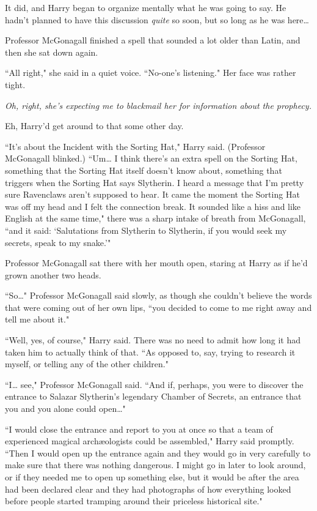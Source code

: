 It did, and Harry began to organize mentally what he was going to say. He hadn't planned to have this discussion \emph{quite} so soon, but so long as he was here{\ldots}

Professor McGonagall finished a spell that sounded a lot older than Latin, and then she sat down again.

``All right," she said in a quiet voice. ``No-one's listening." Her face was rather tight.

\emph{Oh, right, she's expecting me to blackmail her for information about the prophecy.}

Eh, Harry'd get around to that some other day.

``It's about the Incident with the Sorting Hat," Harry said. (Professor McGonagall blinked.) ``Um{\ldots} I think there's an extra spell on the Sorting Hat, something that the Sorting Hat itself doesn't know about, something that triggers when the Sorting Hat says Slytherin. I heard a message that I'm pretty sure Ravenclaws aren't supposed to hear. It came the moment the Sorting Hat was off my head and I felt the connection break. It sounded like a hiss and like English at the same time," there was a sharp intake of breath from McGonagall, ``and it said: `Salutations from Slytherin to Slytherin, if you would seek my secrets, speak to my snake.'{}"

Professor McGonagall sat there with her mouth open, staring at Harry as if he'd grown another two heads.

``So{\ldots}" Professor McGonagall said slowly, as though she couldn't believe the words that were coming out of her own lips, ``you decided to come to me right away and tell me about it."

``Well, yes, of course," Harry said. There was no need to admit how long it had taken him to actually think of that. ``As opposed to, say, trying to research it myself, or telling any of the other children."

``I{\ldots} see," Professor McGonagall said. ``And if, perhaps, you were to discover the entrance to Salazar Slytherin's legendary Chamber of Secrets, an entrance that you and you alone could open{\ldots}"

``I would close the entrance and report to you at once so that a team of experienced magical archæologists could be assembled," Harry said promptly. ``Then I would open up the entrance again and they would go in very carefully to make sure that there was nothing dangerous. I might go in later to look around, or if they needed me to open up something else, but it would be after the area had been declared clear and they had photographs of how everything looked before people started tramping around their priceless historical site."

